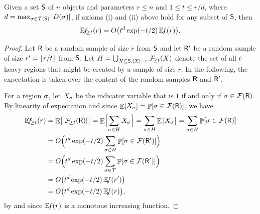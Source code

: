 \begin{lemma}
    Given a set $\mathsf{S}$ of $n$ objects and parameters $r \leq n$ and
    $1 \leq t \leq r/d$, where $d = \max_{\Trap \in \AllRegions\pth
       {\ObjSet}} \cardin{\DefSet{\Trap}}$, if axioms (i) and (ii)
    above hold for any subset of $\mathsf{S}$, then
    \begin{equation}
        \NumOfRegions{t}{r}  %
        = O\bigl( t^d
        \exp\pth{-t/2} \,  \NumOfRegionsZero{ r}
        \bigr).
        \eqlab{exponential:decay}
    \end{equation}    
\end{lemma}
\begin{proof}
    Let $\mathsf{R}$ be a random sample of size $r$ from $\mathsf{S}$ and
    let $\mathsf{R}'$ be a random sample of size $r' = \left\lfloor {r/t} \right\rfloor$ from
    $\mathsf{S}$.  Let $H = \bigcup_{X \subseteq \ObjSet, \cardin{X} = r}
    \RegionsHeavy{t}{X}$ denote the set of all $t$-heavy regions that
    might be created by a sample of size $r$.  In the following, the
    expectation is taken over the content of the random samples
    $\mathsf{R}$ and $\mathsf{R}'$.
    
    For a region $\sigma$, let $X_\sigma$ be the indicator variable that
    is $1$ if and only if $\Trap \in \RegionsSet{\Sample}$. By
    linearity of expectation and since $\Ex{X_\Trap} = \Prob{\Trap\in
       \RegionsSet{\Sample}}$, we have
    \begin{align*}
      \NumOfRegions{t}{r}%
      &=%
        \Ex{\bigl.\cardin{ \RegionsHeavy{t}{\Sample}} }%
        =%
        \Ex{\Bigl. \smash{\sum_{\Trap\in H} X_\Trap}} %
        =%
        \sum_{\Trap\in H} \Ex{\bigl.X_\Trap  } %
        =%
        \sum_{\Trap\in H} \Prob{\Trap\in \RegionsSet{\Sample}
        \MakesBig } %
      \\
      &=%
        O \Bigl( t^d \exp(-t/2) \sum_{\Trap\in H} \Prob{\Trap\in
        \RegionsSet{\SampleA}} \Bigr)%
      \\&%
        =%
        O \Bigl( t^d \exp(-t/2) \sum_{\Trap\in \AllRegions}
        \Prob{\Trap\in \RegionsSet{\SampleA}}\Bigr)%
      \\&%
      =%
      O \pth{ t^d \exp(-t/2)\, \NumOfRegionsZero{r'}}%
      \\&=%
      O \pth{ t^d \exp(-t/2)\, \NumOfRegionsZero{r}},
    \end{align*}
    by  and since $\NumOfRegionsZero{r}$ is a
    monotone increasing function.
\end{proof}

